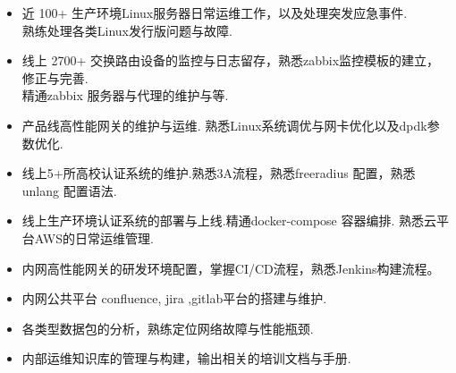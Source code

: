 \documentclass[zh]{resume}
\begin{document}
\begin{itemize}
  \item 近 100+ 生产环境Linux服务器日常运维工作，以及处理突发应急事件.\\ 熟练处理各类Linux发行版问题与故障. 
  \item 线上 2700+ 交换路由设备的监控与日志留存，熟悉zabbix监控模板的建立，修正与完善.\\精通zabbix 服务器与代理的维护与等.
  \item 产品线高性能网关的维护与运维. 熟悉Linux系统调优与网卡优化以及dpdk参数优化.
  \item 线上5+所高校认证系统的维护.熟悉3A流程，熟悉freeradius 配置，熟悉unlang 配置语法.
  \item 线上生产环境认证系统的部署与上线.精通docker-compose 容器编排. 熟悉云平台AWS的日常运维管理. 
  \item 内网高性能网关的研发环境配置，掌握CI/CD流程，熟悉Jenkins构建流程。
  \item 内网公共平台 confluence, jira ,gitlab平台的搭建与维护.
  \item 各类型数据包的分析，熟练定位网络故障与性能瓶颈.
  \item 内部运维知识库的管理与构建，输出相关的培训文档与手册.
\end{itemize}
\end{document}
